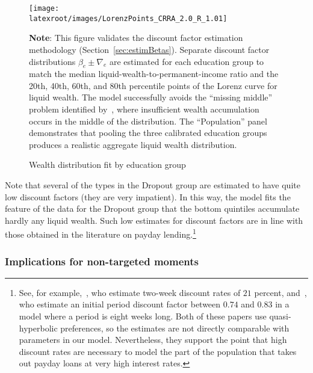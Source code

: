 \documentclass[qe]{econsocart}
\begin{document}
\begin{figure}[htb] 
  \centering
  \caption{Wealth distribution fit by education group}
  \label{fig:LorenzPts} 
  \texttt{[image: \\latexroot/images/LorenzPoints\_CRRA\_2.0\_R\_1.01]}

  \medskip
  \noindent\parbox{\textwidth}{\footnotesize
    \textbf{Note}: This figure validates the discount factor estimation methodology (Section~\ref{sec:estimBetas}).
    Separate discount factor distributions $\beta_e \pm \nabla_e$ are estimated for each education group
    to match the median liquid-wealth-to-permanent-income ratio and the 20th, 40th, 60th, and 80th
    percentile points of the Lorenz curve for liquid wealth.
    The model successfully avoids the ``missing middle'' problem identified by~\cite{kaplanMPC2022},
    where insufficient wealth accumulation occurs in the middle of the distribution.
    The ``Population'' panel demonstrates that pooling the three calibrated education groups
    produces a realistic aggregate liquid wealth distribution.
  }
\end{figure}

\vspace{0.5em}

Note that several of the types in the Dropout group are estimated to have quite low discount factors (they are very impatient).
In this way, the model fits the feature of the data for the Dropout group that the bottom quintiles accumulate hardly any liquid wealth.
Such low estimates for discount factors are in line with those obtained in the literature on payday lending.\footnote{See, for example,~\cite{skiba2008payday}, who estimate two-week discount rates of $21$ percent, and~\cite{allcott2021high}, who estimate an initial period discount factor between $0.74$ and $0.83$ in a model where a period is eight weeks long.
  Both of these papers use quasi-hyperbolic preferences, so the estimates are not directly comparable with parameters in our model.
  Nevertheless, they support the point that high discount rates are necessary to model the part of the population that takes out payday loans at very high interest rates.}

\subsubsection{Implications for non-targeted moments}\label{non-targeted-moments}
\label{sec:nonTargetedMoments}
\end{document}
